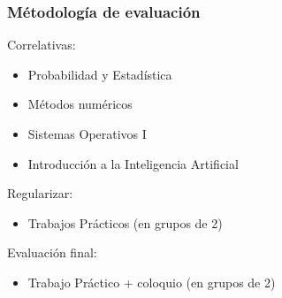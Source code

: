 \begin{frame}
	\frametitle{Métodología de evaluación}
	
	Correlativas:
	\begin{itemize}
		\item Probabilidad y Estadística
		\item Métodos numéricos 
		\item Sistemas Operativos I
		\item Introducción a la Inteligencia Artificial
	\end{itemize}
	
	Regularizar:
	\begin{itemize}
		\item Trabajos Prácticos (en grupos de 2)
	\end{itemize}

	Evaluación final:
	\begin{itemize}
		\item Trabajo Práctico + coloquio (en grupos de 2)
	\end{itemize}
\end{frame}